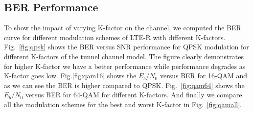 \subsection{BER Performance}
To show the impact of varying K-factor on the channel, we computed the BER curve for different modulation schemes of LTE-R with different K-factors. Fig.~\ref{fig:qpsk} shows the BER versus SNR performance for QPSK modulation for different K-factors of the tunnel channel model. The figure clearly demonstrates for higher K-factor we have a better performance while performance degrades as K-factor goes low. Fig.\ref{fig:qam16} shows the $E_b/N_0$ versus BER for 16-QAM and as we can see the BER is higher compared to QPSK. Fig.~\ref{fig:qam64} shows the $E_b/N_0$ versus BER for 64-QAM for different K-factors. And finally we compare all the modulation schemes for the best and worst K-factor in Fig.~\ref{fig:qamall}.

